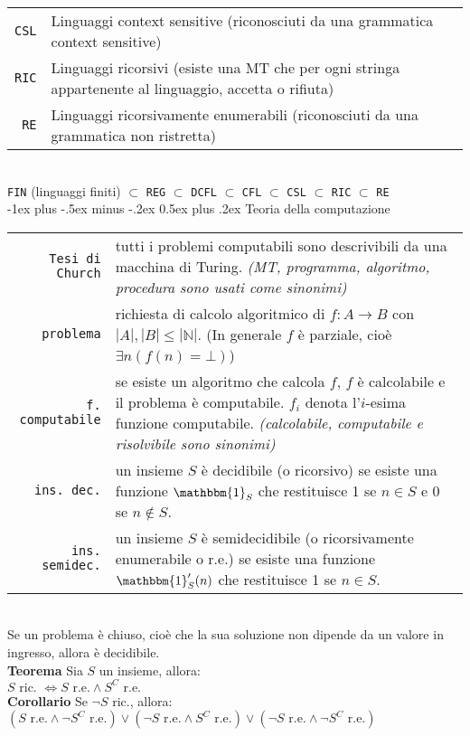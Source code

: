 \documentclass[10pt,landscape]{article}
\makeatletter
\renewcommand{\section}{\@startsection{section}{1}{0mm}%
                                {-1ex plus -.5ex minus -.2ex}%
                                {0.5ex plus .2ex}%
                                {\normalfont\Large\bfseries}}
\makeatother
\begin{document}
\begin{multicols*}{4}
\begin{tabular}{@{}r p{7.6cm}@{}}
                \verb|CSL|  & Linguaggi context sensitive (riconosciuti da una grammatica context sensitive)                              \\
                \verb|RIC|  & Linguaggi ricorsivi (esiste una MT che per ogni stringa appartenente al linguaggio, accetta o rifiuta)      \\
                \verb|RE|   & Linguaggi ricorsivamente enumerabili (riconosciuti da una grammatica non ristretta)                         \\
        \end{tabular} \\ [5pt]
        \verb|FIN| (linguaggi finiti) $\subset$ \verb|REG| $\subset$ \verb|DCFL| $\subset$ \verb|CFL| $\subset$ \verb|CSL| $\subset$ \verb|RIC| $\subset$ \verb|RE|\\ [3pt]
        \section{Teoria della computazione}
        \begin{tabular}{@{}r p{6.5cm}@{}}
                \verb|Tesi di Church| & tutti i problemi computabili sono descrivibili da una macchina di Turing. \textit{(MT, programma, algoritmo, procedura sono usati come sinonimi)}                                                     \\
                \verb|problema|       & richiesta di calcolo algoritmico di $f:A\rightarrow B$ con $|A|,|B| \leq |\mathbb{N}|$. (In generale $f$ è parziale, cioè $\exists n(f(n)=\bot)$)                                                     \\
                \verb|f. computabile| & se esiste un algoritmo che calcola $f$, $f$ è calcolabile e il problema è computabile. $f_i$ denota l'$i$-esima funzione computabile. \textit{(calcolabile, computabile e risolvibile sono sinonimi)} \\
                \verb|ins. dec.|      & un insieme $S$ è decidibile (o ricorsivo) se esiste una funzione $\mathbbm{1}_S$ che restituisce 1 se $n \in S$ e 0 se $n \notin S$.                                                                  \\
                \verb|ins. semidec.|  & un insieme $S$ è semidecidibile (o ricorsivamente enumerabile o r.e.) se esiste una funzione $\mathbbm{1}'_S(n)$ che restituisce 1 se $n \in S$.                                                      \\
        \end{tabular} \\[3pt]
        Se un problema è chiuso, cioè che la sua soluzione non dipende da un valore in ingresso, allora è decidibile. \\[3pt]
        \textbf{Teorema} Sia $S$ un insieme, allora:\\ $S \text{ ric. } \iff S \text{ r.e.} \land S^C \text{ r.e.}$ \\ [3pt]
        \textbf{Corollario} Se $\lnot S$ ric., allora: \\
        $(S \text{ r.e.} \land \lnot S^C \text{ r.e.}) \lor (\lnot S \text{ r.e.} \land S^C \text{ r.e.}) \lor (\lnot S \text{ r.e.} \land \lnot S^C \text{ r.e.})$

\end{multicols*}
\end{document}
